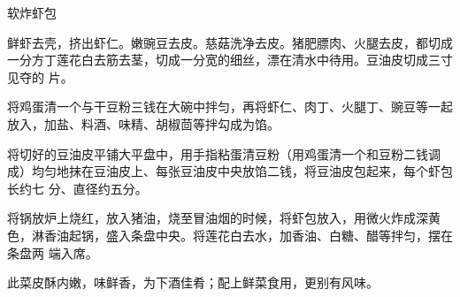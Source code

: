 \begin{recipe}{软炸虾包}

\ingredients


\preparation

\step 鲜虾去壳，挤出虾仁。嫩豌豆去皮。慈菇洗净去皮。猪肥膘肉、火腿去皮，都切成
一分方丁莲花白去筋去茎，切成一分宽的细丝，漂在清水中待用。豆油皮切成三寸见夺的
片。

\step 将鸡蛋清一个与干豆粉三钱在大碗中拌匀，再将虾仁、肉丁、火腿丁、豌豆等一起
放入，加盐、料酒、味精、胡椒茴等拌勾成为馅。

\step 将切好的豆油皮平铺大平盘中，用手指粘蛋清豆粉（用鸡蛋清一个和豆粉二钱调
成）均匀地抹在豆油皮上、每张豆油皮中央放馅二钱，将豆油皮包起来，每个虾包长约七
分、直径约五分。

\step 将锅放炉上烧红，放入猪油，烧至冒油烟的时候，将虾包放入，用微火炸成深黄
色，淋香油起锅，盛入条盘中央。将莲花白去水，加香油、白糖、醋等拌匀，摆在条盘两
端入席。

\features

此菜皮酥内嫩，味鲜香，为下酒佳肴；配上鲜菜食用，更别有风味。

\end{recipe}

